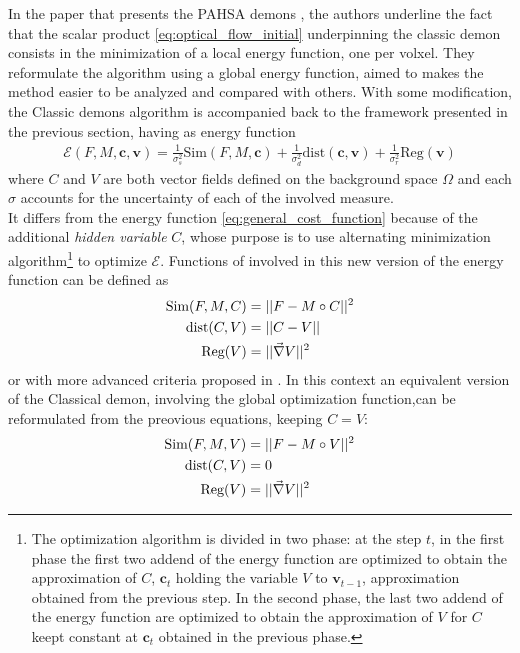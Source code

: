 In the paper that presents the PAHSA demons \cite{cachier2003iconic}, the authors underline the fact that the scalar product \ref{eq:optical_flow_initial} underpinning the classic demon consists in the minimization of a local energy function, one per volxel. They reformulate the algorithm using a global energy function, aimed to makes the method easier to be analyzed and compared with others. With some modification, the Classic demons algorithm is accompanied back to the framework presented in the previous section, having as energy function
\begin{align}
\mathcal{E}(F, M, \mathbf{c}, \mathbf{v}) = \frac{1}{\sigma_{s}^{2}}\text{Sim}(F,M,\mathbf{c}) + \frac{1}{\sigma_{d}^{2}}\text{dist}(\mathbf{c},\mathbf{v}) +  \frac{1}{\sigma_{r}^{2}}\text{Reg}(\mathbf{v}) 
\end{align}
where $C$ and $V$ are both vector fields defined on the background space $\Omega$ and each $\sigma$ accounts for the uncertainty of each of the involved measure.\\
It differs from the energy function \ref{eq:general_cost_function} because of the additional \emph{hidden variable} $C$, whose purpose is to use alternating minimization algorithm\footnote{
	The optimization algorithm is divided in two phase: at the step $t$, in the first phase the first two addend of the energy function are optimized to obtain the approximation of $C$, $\mathbf{c}_{t}$ holding the variable $V$ to $\mathbf{v}_{t-1}$, approximation obtained from the previous step. In the second phase, the last two addend of the energy function are optimized to obtain the approximation of $V$ for $C$ keept constant at $\mathbf{c}_{t}$ obtained in the previous phase.
	} 
to optimize $\mathcal{E}$. Functions of involved in this new version of the energy function can be defined as
\begin{align*}
\text{Sim}(F,M,C) &= \vert\lvert  F - M\circ C   \rvert\vert^{2}\\
\text{dist}(C,V) &=\vert\lvert C - V \rvert\vert  \\
\text{Reg}(V)  &=\vert\lvert \vec \nabla V   \rvert\vert^{2}
\end{align*}
or with more advanced criteria proposed in \cite{cachier2003iconic}. In this context an equivalent version of the Classical demon, involving the global optimization function,can be reformulated from the preovious equations, keeping $C=V$:
\begin{align*}
\text{Sim}(F,M,V) &= \vert\lvert  F - M\circ V   \rvert\vert^{2}\\
\text{dist}(C,V) &=0 \\
\text{Reg}(V)  &=\vert\lvert \vec \nabla V   \rvert\vert^{2}
\end{align*}
